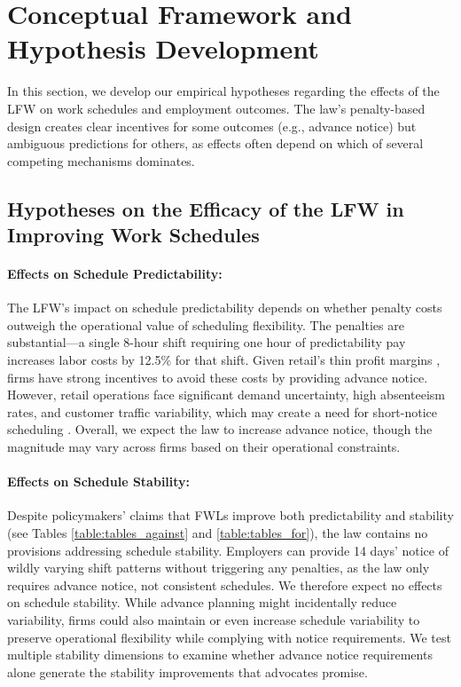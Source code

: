 \documentclass[letterpaper,11pt,leqno]{article}
\theoremstyle{paper}
\begin{document}
\section{Conceptual Framework and Hypothesis Development} \label{sec:hyp}

In this section, we develop our empirical hypotheses regarding the effects of the LFW on work schedules and employment outcomes. The law's penalty-based design creates clear incentives for some outcomes (e.g., advance notice) but ambiguous predictions for others, as effects often depend on which of several competing mechanisms dominates.


\subsection{Hypotheses on the Efficacy of the LFW in Improving Work Schedules}

\paragraph{Effects on Schedule Predictability:}
The LFW's impact on schedule predictability depends on whether penalty costs outweigh the operational value of scheduling flexibility. The penalties are substantial—a single 8-hour shift requiring one hour of predictability pay increases labor costs by 12.5\% for that shift. Given retail's thin profit margins \citep{fisher_raman_2010}, firms have strong incentives to avoid these costs by providing advance notice. However, retail operations face significant demand uncertainty, high absenteeism rates, and customer traffic variability, which may create a need for short-notice scheduling \citep{netessine_traffic,kesavan_traffic,kwon_late}. Overall, we expect the law to increase advance notice, though the magnitude may vary across firms based on their operational constraints.

\paragraph{Effects on Schedule Stability:}
Despite policymakers' claims that FWLs improve both predictability and stability (see Tables \ref{table:tables_against} and \ref{table:tables_for}), the law contains no provisions addressing schedule stability. Employers can provide 14 days' notice of wildly varying shift patterns without triggering any penalties, as the law only requires advance notice, not consistent schedules. We therefore expect no effects on schedule stability. While advance planning might incidentally reduce variability, firms could also maintain or even increase schedule variability to preserve operational flexibility while complying with notice requirements. We test multiple stability dimensions to examine whether advance notice requirements alone generate the stability improvements that advocates promise.
\end{document}
